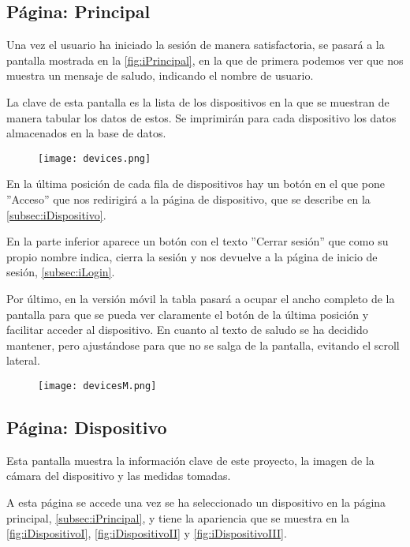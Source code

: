 \subsection{Página: Principal}\label{subsec:iPrincipal}
Una vez el usuario ha iniciado la sesión de manera satisfactoria, se pasará a la pantalla mostrada en la \autoref{fig:iPrincipal}, en la que de primera podemos ver que nos muestra un mensaje de saludo, indicando el nombre de usuario.

La clave de esta pantalla es la lista de los dispositivos en la que se muestran de manera tabular los datos de estos. Se imprimirán para cada dispositivo los datos almacenados en la base de datos.
\begin{figure}[H]
	{\texttt{[image: devices.png]}}
\end{figure}
En la última posición de cada fila de dispositivos hay un botón en el que pone ''Acceso'' que nos redirigirá a la página de dispositivo, que se describe en la \autoref{subsec:iDispositivo}.

En la parte inferior aparece un botón con el texto ''Cerrar sesión'' que como su propio nombre indica, cierra la sesión y nos devuelve a la página de inicio de sesión, \autoref{subsec:iLogin}.

Por último, en la versión móvil la tabla pasará a ocupar el ancho completo de la pantalla para que se pueda ver claramente el botón de la última posición y facilitar acceder al dispositivo. En cuanto al texto de saludo se ha decidido mantener, pero ajustándose para que no se salga de la pantalla, evitando el scroll lateral.
\begin{figure}[H]
	{\texttt{[image: devicesM.png]}}
\end{figure}

\subsection{Página: Dispositivo}\label{subsec:iDispositivo}
Esta pantalla muestra la información clave de este proyecto, la imagen de la cámara del dispositivo y las medidas tomadas. 

A esta página se accede una vez se ha seleccionado un dispositivo en la página principal, \autoref{subsec:iPrincipal}, y tiene la apariencia que se muestra en la \autoref{fig:iDispositivoI}, \autoref{fig:iDispositivoII} y \autoref{fig:iDispositivoIII}.

